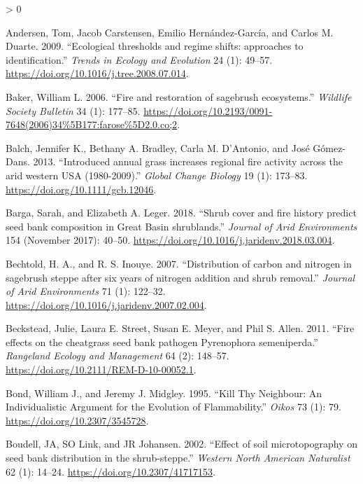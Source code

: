 \documentclass[
  12pt,
]{article}
\newlength{\cslhangindent}
\newenvironment{CSLReferences}[2] %
 {%
  \setlength{\parindent}{0pt}
  \ifodd #1 \everypar{\setlength{\hangindent}{\cslhangindent}}\ignorespaces\fi
  \ifnum #2 > 0
  \setlength{\parskip}{#2\baselineskip}
  \fi
 }%
 {}
\begin{document}
\hypertarget{refs}{}
\begin{CSLReferences}{1}{0}
\leavevmode\hypertarget{ref-Andersen2009}{}%
Andersen, Tom, Jacob Carstensen, Emilio Hernández-García, and Carlos M.
Duarte. 2009. {``{Ecological thresholds and regime shifts: approaches to
identification}.''} \emph{Trends in Ecology and Evolution} 24 (1):
49--57. \url{https://doi.org/10.1016/j.tree.2008.07.014}.

\leavevmode\hypertarget{ref-Baker2006}{}%
Baker, William L. 2006. {``{Fire and restoration of sagebrush
ecosystems}.''} \emph{Wildlife Society Bulletin} 34 (1): 177--85.
\url{https://doi.org/10.2193/0091-7648(2006)34\%5B177:farose\%5D2.0.co;2}.

\leavevmode\hypertarget{ref-Balch2013}{}%
Balch, Jennifer K., Bethany A. Bradley, Carla M. D'Antonio, and José
Gómez-Dans. 2013. {``{Introduced annual grass increases regional fire
activity across the arid western USA (1980-2009)}.''} \emph{Global
Change Biology} 19 (1): 173--83.
\url{https://doi.org/10.1111/gcb.12046}.

\leavevmode\hypertarget{ref-Barga2018}{}%
Barga, Sarah, and Elizabeth A. Leger. 2018. {``{Shrub cover and fire
history predict seed bank composition in Great Basin shrublands}.''}
\emph{Journal of Arid Environments} 154 (November 2017): 40--50.
\url{https://doi.org/10.1016/j.jaridenv.2018.03.004}.

\leavevmode\hypertarget{ref-Bechtold2007}{}%
Bechtold, H. A., and R. S. Inouye. 2007. {``{Distribution of carbon and
nitrogen in sagebrush steppe after six years of nitrogen addition and
shrub removal}.''} \emph{Journal of Arid Environments} 71 (1): 122--32.
\url{https://doi.org/10.1016/j.jaridenv.2007.02.004}.

\leavevmode\hypertarget{ref-Beckstead2011}{}%
Beckstead, Julie, Laura E. Street, Susan E. Meyer, and Phil S. Allen.
2011. {``{Fire effects on the cheatgrass seed bank pathogen Pyrenophora
semeniperda}.''} \emph{Rangeland Ecology and Management} 64 (2):
148--57. \url{https://doi.org/10.2111/REM-D-10-00052.1}.

\leavevmode\hypertarget{ref-Bond1995}{}%
Bond, William J., and Jeremy J. Midgley. 1995. {``{Kill Thy Neighbour:
An Individualistic Argument for the Evolution of Flammability}.''}
\emph{Oikos} 73 (1): 79. \url{https://doi.org/10.2307/3545728}.

\leavevmode\hypertarget{ref-Boudell2002}{}%
Boudell, JA, SO Link, and JR Johansen. 2002. {``{Effect of soil
microtopography on seed bank distribution in the shrub-steppe}.''}
\emph{Western North American Naturalist} 62 (1): 14--24.
\url{https://doi.org/10.2307/41717153}.


\end{CSLReferences}
\end{document}
